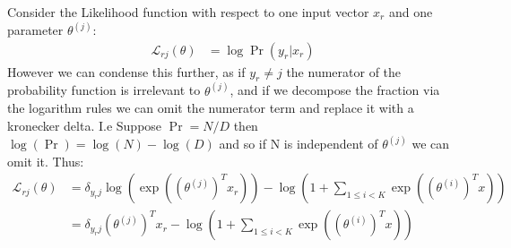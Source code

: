 \documentclass[12pt]{article}
\begin{document}
Consider the Likelihood function with respect to one input vector $x_r$
and one parameter $\theta^{(j)}$:
\begin{align*}
    \mathcal{L}_{rj}(\theta) &= \log\Pr(y_r | x_r)  
\end{align*}
However we can condense this further, as if $y_r \neq j$ the numerator of the probability
function is irrelevant to $\theta^{(j)}$, and if we decompose the fraction via the logarithm rules
we can omit the numerator term and replace it with a kronecker delta. I.e Suppose $\Pr = N/D$
then $\log(\Pr) = \log(N) - \log(D)$  and so if N is independent of $\theta^(j)$ we can omit it.
Thus:
\begin{align*}
     \mathcal{L}_{rj}(\theta) &= \delta_{{y_r}j}\log(\exp((\theta^{(j)})^Tx_r)) - \log(1 + \displaystyle \sum_{1 \leq i < K}\exp((\theta^{(i)})^Tx)) \\
     &= \delta_{{y_r}j}(\theta^{(j)})^Tx_r - \log(1 + \displaystyle \sum_{1 \leq i < K}\exp((\theta^{(i)})^Tx))
\end{align*}
\end{document}
